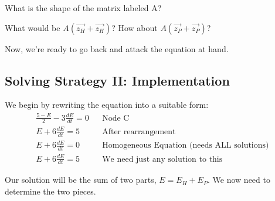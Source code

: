 \begin{alevel}
What is the shape of the matrix labeled A?
\end{alevel}

\begin{clevel}
What would be $A(\vec{z_H}+\vec{z_H})$? How about $A(\vec{z_P}+\vec{z_P})$?
\end{clevel}

Now, we're ready to go back and attack the equation at hand.

\subsection{Solving Strategy II: Implementation}
We begin by rewriting the equation into a suitable form:
\begin{align*}
\frac{5-E}{2}-3\frac{dE}{dt}=0 &&\text{Node C}\\
E+6\frac{dE}{dt}=5 &&\text{After rearrangement}\\
E+6\frac{dE}{dt}=0 &&\text{Homogeneous Equation (needs ALL solutions)}\\
E+6\frac{dE}{dt}=5 &&\text{We need just any solution to this}
\end{align*}

Our solution will be the sum of two parts, $E=E_H+E_P$. We now need to determine the two pieces. 


